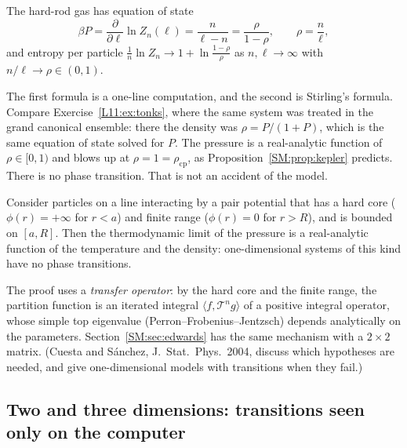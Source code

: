 \begin{proposition}[Tonks 1936]\label{SM:prop:tonks}
The hard-rod gas has equation of state
\[
  \beta P=\frac{\partial}{\partial\ell}\ln Z_n(\ell)=\frac{n}{\ell-n}=\frac{\rho}{1-\rho},\qquad\rho=\frac n\ell,
\]
and entropy per particle $\frac1n\ln Z_n\to1+\ln\frac{1-\rho}{\rho}$ as $n,\ell\to\infty$ with
$n/\ell\to\rho\in(0,1)$.
\end{proposition}

The first formula is a one-line computation, and the second is Stirling's formula. Compare
Exercise~\ref{L11:ex:tonks}, where the same system was treated in the grand canonical ensemble: there
the density was $\rho=P/(1+P)$, which is the same equation of state solved for $P$. The pressure is a
real-analytic function of $\rho\in[0,1)$ and blows up at $\rho=1=\rho_{\mathrm{cp}}$, as
Proposition~\ref{SM:prop:kepler} predicts. There is no phase transition. That is not an accident of the
model.

\begin{theorem}\label{SM:thm:vanhove}
Consider particles on a line interacting by a pair potential that has a hard core ($\phi(r)=+\infty$ for
$r<a$) and finite range ($\phi(r)=0$ for $r>R$), and is bounded on $[a,R]$. Then the thermodynamic
limit of the pressure is a real-analytic function of the temperature and the density: one-dimensional
systems of this kind have no phase transitions.
\end{theorem}

The proof uses a \emph{transfer operator}: by the hard core and the finite range, the partition function
is an iterated integral $\langle f,\mathcal T^ng\rangle$ of a positive integral operator, whose simple top
eigenvalue (Perron--Frobenius--Jentzsch) depends analytically on the parameters. Section~\ref{SM:sec:edwards}
has the same mechanism with a $2\times2$ matrix. (Cuesta and S\'anchez, J.~Stat.~Phys.\ 2004, discuss
which hypotheses are needed, and give one-dimensional models with transitions when they fail.)

\subsection*{Two and three dimensions: transitions seen only on the computer}

